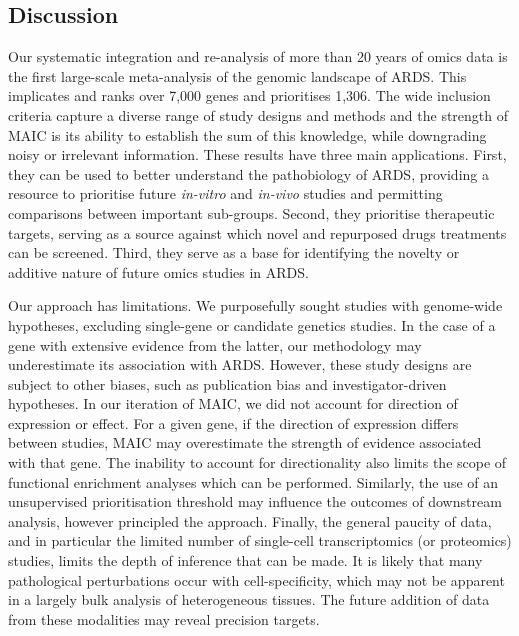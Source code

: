 \documentclass[
  11,
  a4paper,
]{article}
\begin{document}
\newpage

\hypertarget{discussion}{%
\subsection{Discussion}\label{discussion}}

Our systematic integration and re-analysis of more than 20 years of
omics data is the first large-scale meta-analysis of the genomic
landscape of ARDS. This implicates and ranks over 7,000 genes and
prioritises 1,306. The wide inclusion criteria capture a diverse range
of study designs and methods and the strength of MAIC is its ability to
establish the sum of this knowledge, while downgrading noisy or
irrelevant information. These results have three main applications.
First, they can be used to better understand the pathobiology of ARDS,
providing a resource to prioritise future \emph{in-vitro} and
\emph{in-vivo} studies and permitting comparisons between important
sub-groups. Second, they prioritise therapeutic targets, serving as a
source against which novel and repurposed drugs treatments can be
screened. Third, they serve as a base for identifying the novelty or
additive nature of future omics studies in ARDS.

Our approach has limitations. We purposefully sought studies with
genome-wide hypotheses, excluding single-gene or candidate genetics
studies. In the case of a gene with extensive evidence from the latter,
our methodology may underestimate its association with ARDS. However,
these study designs are subject to other biases, such as publication
bias and investigator-driven hypotheses. In our iteration of MAIC, we
did not account for direction of expression or effect. For a given gene,
if the direction of expression differs between studies, MAIC may
overestimate the strength of evidence associated with that gene. The
inability to account for directionality also limits the scope of
functional enrichment analyses which can be performed. Similarly, the
use of an unsupervised prioritisation threshold may influence the
outcomes of downstream analysis, however principled the approach.
Finally, the general paucity of data, and in particular the limited
number of single-cell transcriptomics (or proteomics) studies, limits
the depth of inference that can be made. It is likely that many
pathological perturbations occur with cell-specificity, which may not be
apparent in a largely bulk analysis of heterogeneous tissues. The future
addition of data from these modalities may reveal precision targets.
\end{document}
